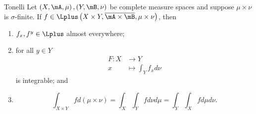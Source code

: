 \documentclass[pmath451]{subfiles}
\begin{document}
    \clearpage

    \begin{theorem}{Tonelli}
        Let $\left( X,\mA,\mu \right),\left( Y,\mB,\nu \right)$ be complete measure spaces and suppose $\mu\times\nu$ is $\sigma$-finite. If $f\in\Lplus\left( X\times Y,\overline{\mA\times\mB},\mu\times\nu \right)$, then
        \begin{enumerate}
            \item $f_x,f^y\in\Lplus$ almost everywhere;
            \item for all $y\in Y$
                \begin{equation*}
                    \begin{aligned}
                        F:X&\to Y \\
                        x&\mapsto\int_Yf_xd\nu
                    \end{aligned} 
                \end{equation*}
                is integrable; and
            \item
                \begin{equation*}
                    \int_{X\times Y} fd\left( \mu\times\nu \right) = \int_X\int_Y fd\nu d\mu = \int_Y\int_X fd\mu d\nu.
                \end{equation*}
        \end{enumerate}
    \end{theorem}
\end{document}

